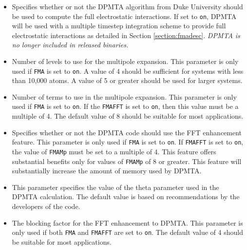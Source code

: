\begin{itemize}

\item
{}
{Specifies whether or not 
the DPMTA algorithm from Duke University should be used 
to compute the full electrostatic interactions.  If set to 
{\tt on}, DPMTA will be used with a multiple timestep integration scheme 
to provide full electrostatic interactions as detailed in Section 
\ref{section:fmadesc}.  {\em DPMTA is no longer included in released binaries.}}

\item
{}
{Number of levels to use for the multipole expansion.  This parameter
is only used if {\tt FMA} is set to {\tt on}.  
A value of 4 should be sufficient for systems with less than 10,000 atoms.  
A value of 5 or greater should be used for larger systems. }

\item
{}
{Number of terms to use in the multipole expansion.  
This parameter is only used if {\tt FMA} is set to {\tt on}.  
If the {\tt FMAFFT} is set to {\tt on}, then this value must 
be a multiple of 4.  The default value of 8 should be suitable
for most applications.}

\item
{}
{Specifies whether or not the DPMTA code should use the FFT enhancement 
feature.  This parameter is only used if {\tt FMA} is set to {\tt on}.  
If {\tt FMAFFT} is set to {\tt on}, the value of {\tt FMAMp} must be 
set to a multiple of 4.  
This feature offers substantial benefits only for values 
of {\tt FMAMp} of 8 or greater.  This feature will substantially 
increase the amount of memory used by DPMTA.}


\item
{}
{This parameter specifies the value of the theta parameter
used in the DPMTA calculation.  The default value is based on
recommendations by the developers of the code.}

\item
{}
{The blocking factor for the FFT enhancement to DPMTA.
This parameter is only used if both {\tt FMA} and {\tt FMAFFT} 
are set to {\tt on}.  The default value of 4 should be suitable
for most applications.}

\end{itemize}

